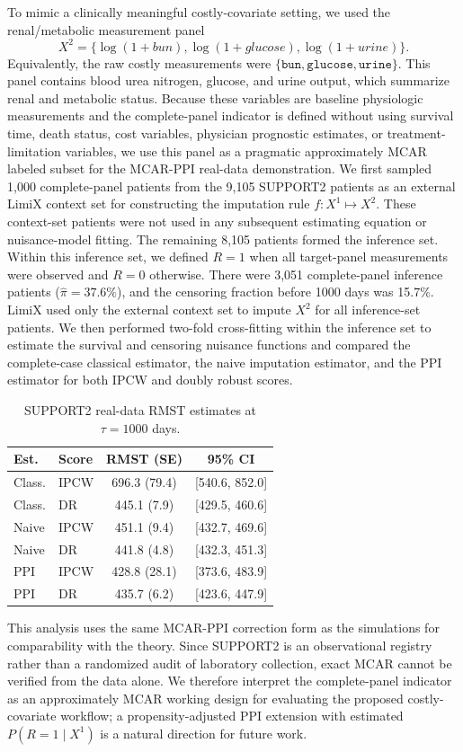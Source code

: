 To mimic a clinically meaningful costly-covariate setting, we used the renal/metabolic measurement panel
\[
    X^2 = \{\log(1+bun), \log(1+glucose), \log(1+urine)\}.
\]
Equivalently, the raw costly measurements were $\{\texttt{bun}, \texttt{glucose}, \texttt{urine}\}$. This panel contains blood urea nitrogen, glucose, and urine output, which summarize renal and metabolic status. Because these variables are baseline physiologic measurements and the complete-panel indicator is defined without using survival time, death status, cost variables, physician prognostic estimates, or treatment-limitation variables, we use this panel as a pragmatic approximately MCAR labeled subset for the MCAR-PPI real-data demonstration. We first sampled 1,000 complete-panel patients from the 9,105 SUPPORT2 patients as an external LimiX context set for constructing the imputation rule $f:X^1\mapsto X^2$. These context-set patients were not used in any subsequent estimating equation or nuisance-model fitting. The remaining 8,105 patients formed the inference set. Within this inference set, we defined $R=1$ when all target-panel measurements were observed and $R=0$ otherwise. There were 3,051 complete-panel inference patients ($\hat\pi=37.6\%$), and the censoring fraction before 1000 days was 15.7\%. LimiX used only the external context set to impute $X^2$ for all inference-set patients. We then performed two-fold cross-fitting within the inference set to estimate the survival and censoring nuisance functions and compared the complete-case classical estimator, the naive imputation estimator, and the PPI estimator for both IPCW and doubly robust scores.

\begin{table}[t]
\centering
\small
\setlength{\tabcolsep}{3pt}
\begin{tabular}{@{}llcc@{}}
\toprule
Est. & Score & RMST (SE) & 95\% CI \\
\midrule
Class. & IPCW & 696.3 (79.4) & [540.6, 852.0] \\
Class. & DR & 445.1 (7.9) & [429.5, 460.6] \\
Naive & IPCW & 451.1 (9.4) & [432.7, 469.6] \\
Naive & DR & 441.8 (4.8) & [432.3, 451.3] \\
PPI & IPCW & 428.8 (28.1) & [373.6, 483.9] \\
PPI & DR & 435.7 (6.2) & [423.6, 447.9] \\
\bottomrule
\end{tabular}
\caption{SUPPORT2 real-data RMST estimates at $\tau=1000$ days.}
\label{tab:support2-rmst}
\end{table}

This analysis uses the same MCAR-PPI correction form as the simulations for comparability with the theory. Since SUPPORT2 is an observational registry rather than a randomized audit of laboratory collection, exact MCAR cannot be verified from the data alone. We therefore interpret the complete-panel indicator as an approximately MCAR working design for evaluating the proposed costly-covariate workflow; a propensity-adjusted PPI extension with estimated $P(R=1\mid X^1)$ is a natural direction for future work.
